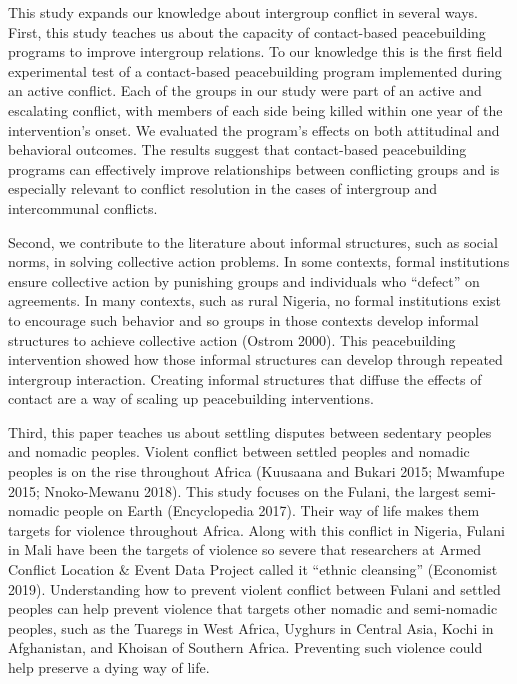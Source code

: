 \documentclass[11pt]{article}
\begin{document}
This study expands our knowledge about intergroup conflict in several
ways. First, this study teaches us about the capacity of contact-based
peacebuilding programs to improve intergroup relations. To our knowledge
this is the first field experimental test of a contact-based
peacebuilding program implemented during an active conflict. Each of the
groups in our study were part of an active and escalating conflict, with
members of each side being killed within one year of the intervention's
onset. We evaluated the program's effects on both attitudinal and
behavioral outcomes. The results suggest that contact-based
peacebuilding programs can effectively improve relationships between
conflicting groups and is especially relevant to conflict resolution in
the cases of intergroup and intercommunal conflicts.

Second, we contribute to the literature about informal structures, such
as social norms, in solving collective action problems. In some
contexts, formal institutions ensure collective action by punishing
groups and individuals who ``defect'' on agreements. In many contexts,
such as rural Nigeria, no formal institutions exist to encourage such
behavior and so groups in those contexts develop informal structures to
achieve collective action (Ostrom 2000). This peacebuilding intervention
showed how those informal structures can develop through repeated
intergroup interaction. Creating informal structures that diffuse the
effects of contact are a way of scaling up peacebuilding interventions.

Third, this paper teaches us about settling disputes between sedentary
peoples and nomadic peoples. Violent conflict between settled peoples
and nomadic peoples is on the rise throughout Africa (Kuusaana and
Bukari 2015; Mwamfupe 2015; Nnoko-Mewanu 2018). This study focuses on
the Fulani, the largest semi-nomadic people on Earth (Encyclopedia
2017). Their way of life makes them targets for violence throughout
Africa. Along with this conflict in Nigeria, Fulani in Mali have been
the targets of violence so severe that researchers at Armed Conflict
Location \& Event Data Project called it ``ethnic cleansing'' (Economist
2019). Understanding how to prevent violent conflict between Fulani and
settled peoples can help prevent violence that targets other nomadic and
semi-nomadic peoples, such as the Tuaregs in West Africa, Uyghurs in
Central Asia, Kochi in Afghanistan, and Khoisan of Southern Africa.
Preventing such violence could help preserve a dying way of life.
\end{document}
